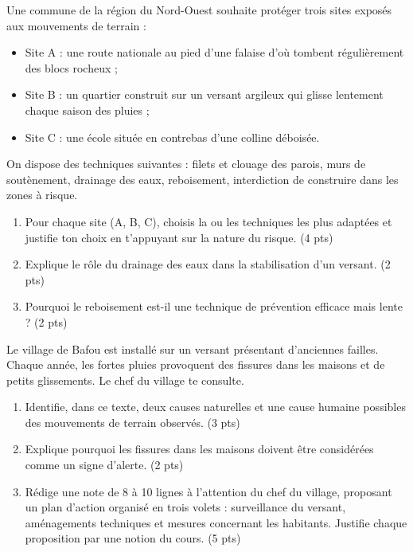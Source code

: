 \documentclass[11pt]{article}
\begin{document}
\begin{exercice}
Une commune de la région du Nord-Ouest souhaite protéger trois sites exposés aux mouvements de terrain :
\begin{itemize}
\item Site A : une route nationale au pied d'une falaise d'où tombent régulièrement des blocs rocheux ;
\item Site B : un quartier construit sur un versant argileux qui glisse lentement chaque saison des pluies ;
\item Site C : une école située en contrebas d'une colline déboisée.
\end{itemize}
On dispose des techniques suivantes : filets et clouage des parois, murs de soutènement, drainage des eaux, reboisement, interdiction de construire dans les zones à risque.
\begin{enumerate}
\item Pour chaque site (A, B, C), choisis la ou les techniques les plus adaptées et justifie ton choix en t'appuyant sur la nature du risque. \hfill (4 pts)
\item Explique le rôle du drainage des eaux dans la stabilisation d'un versant. \hfill (2 pts)
\item Pourquoi le reboisement est-il une technique de prévention efficace mais lente ? \hfill (2 pts)
\end{enumerate}
\end{exercice}

\begin{exercice}
Le village de Bafou est installé sur un versant présentant d'anciennes failles. Chaque année, les fortes pluies provoquent des fissures dans les maisons et de petits glissements. Le chef du village te consulte.
\begin{enumerate}
\item Identifie, dans ce texte, deux causes naturelles et une cause humaine possibles des mouvements de terrain observés. \hfill (3 pts)
\item Explique pourquoi les fissures dans les maisons doivent être considérées comme un signe d'alerte. \hfill (2 pts)
\item Rédige une note de 8 à 10 lignes à l'attention du chef du village, proposant un plan d'action organisé en trois volets : surveillance du versant, aménagements techniques et mesures concernant les habitants. Justifie chaque proposition par une notion du cours. \hfill (5 pts)
\end{enumerate}
\end{exercice}
\end{document}
